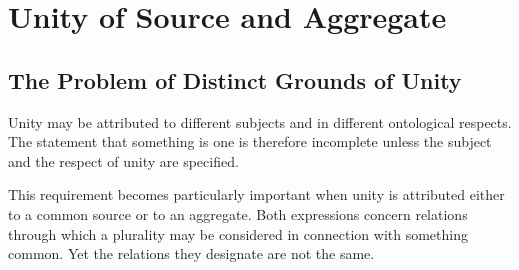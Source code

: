 %
%
%
%
%

\section{Unity of Source and Aggregate}
\label{sec:unity-of-source-and-aggregate}


\subsection{The Problem of Distinct Grounds of Unity}

Unity may be attributed to different subjects and in
different ontological respects. The statement that
something is one is therefore incomplete unless the
subject and the respect of unity are specified.

This requirement becomes particularly important when
unity is attributed either to a common source or to
an aggregate. Both expressions concern relations
through which a plurality may be considered in
connection with something common. Yet the relations
they designate are not the same.

